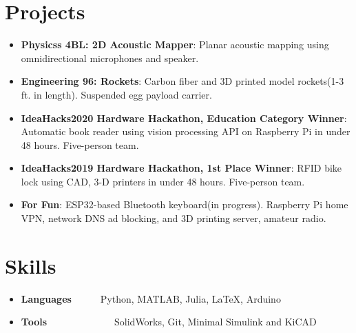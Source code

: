 \documentclass[a4paper,20pt]{article}
\makeatletter
\newcommand{\resumeItem}[2]{
  \item\small{
    \textbf{#1}{#2 \vspace{-2pt}}
  }
}
\newcommand{\resumeSubheading}[4]{
  \vspace{-1pt}\item
    \begin{tabular*}{0.97\textwidth}{l@{\extracolsep{\fill}}r}
      \textbf{#1} & #2 \\
      \textit{#3} & \textit{#4} \\
    \end{tabular*}\vspace{-5pt}
}
\newcommand{\resumeSubItem}[2]{\resumeItem{#1}{#2}\vspace{-3pt}}
\newcommand{\resumeSubHeadingListStart}{\begin{itemize}[leftmargin=*]}
\newcommand{\resumeSubHeadingListEnd}{\end{itemize}}
\newcommand{\resumeItemListStart}{\begin{itemize}}
\newcommand{\resumeItemListEnd}{\end{itemize}\vspace{-5pt}}
\makeatother
\begin{document}
\vspace{-10pt}
\section{Projects}
\resumeSubHeadingListStart
    	\resumeSubItem{Physicss 4BL: 2D Acoustic Mapper}{: Planar acoustic mapping using omnidirectional microphones and speaker.}
        \resumeSubItem{Engineering 96: Rockets}{: Carbon fiber and 3D printed model rockets(1-3 ft. in length). Suspended egg payload carrier.}
    

\vspace{2pt}


\vspace{-2pt}
\resumeSubItem{IdeaHacks2020 Hardware Hackathon, Education Category Winner}{: Automatic book reader using vision processing API on Raspberry Pi in under 48 hours. Five-person team.}
\resumeSubItem{IdeaHacks2019 Hardware Hackathon, 1st Place Winner}{: RFID bike lock using CAD, 3-D printers in under 48 hours. Five-person team.}
\resumeSubItem{For Fun}{: ESP32-based Bluetooth keyboard(in progress). Raspberry Pi home VPN, network DNS ad blocking, and 3D printing server, amateur radio.}



\vspace{2pt}
\resumeSubHeadingListEnd

\vspace{-10pt}

\section{Skills}
	\resumeSubHeadingListStart
	\resumeSubItem{Languages}{~~~~~~Python, MATLAB, Julia, \LaTeX, Arduino }
	\resumeSubItem{Tools}{~~~~~~~~~~~~~~SolidWorks, Git, Minimal Simulink and KiCAD}
\resumeSubHeadingListEnd

\vspace{-5pt}


%
\end{document}

